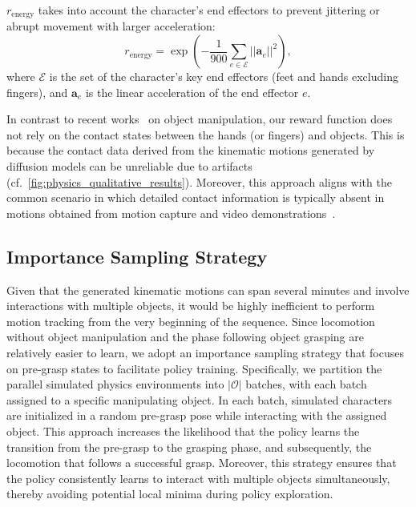 $r_\text{energy}$ takes into account the character's end effectors to prevent jittering or abrupt movement with larger acceleration:
\begin{equation}
    r_\text{energy} = \exp\left(-\frac{1}{900}\sum_{e\in\mathcal{E}} ||\mathbf{a}_e||^2\right),
\end{equation}
where $\mathcal{E}$ is the set of the character's key end effectors (feet and hands excluding fingers), and $\mathbf{a}_e$ is the linear acceleration of the end effector $e$.

In contrast to recent works~\cite{brahmbhatt2019contactgrasp,wang2023physhoi,luo2024grasping} on object manipulation, our reward function does not rely on the contact states between the hands (or fingers) and objects. This is because the contact data derived from the kinematic motions generated by diffusion models can be unreliable due to artifacts (cf.~\cref{fig:physics_qualitative_results}). Moreover, this approach aligns with the common scenario in which detailed contact information is typically absent in motions obtained from motion capture and video demonstrations~\cite{pollard2005physically}.


\subsection{Importance Sampling Strategy}

Given that the generated kinematic motions can span several minutes and involve interactions with multiple objects, it would be highly inefficient to perform motion tracking from the very beginning of the sequence. Since locomotion without object manipulation and the phase following object grasping are relatively easier to learn, we adopt an importance sampling strategy that focuses on pre-grasp states to facilitate policy training.
Specifically, we partition the parallel simulated physics environments into $|\mathcal{O}|$ batches, with each batch assigned to a specific manipulating object. In each batch, simulated characters are initialized in a random pre-grasp pose while interacting with the assigned object. This approach increases the likelihood that the policy learns the transition from the pre-grasp to the grasping phase, and subsequently, the locomotion that follows a successful grasp.
Moreover, this strategy ensures that the policy consistently learns to interact with multiple objects simultaneously, thereby avoiding potential local minima during policy exploration.




